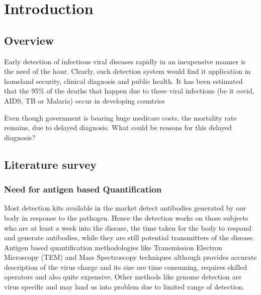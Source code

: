 \documentclass{FR16}
\begin{document}
\maketitle

\tableofcontents
\newpage

\section{Introduction}

\subsection{Overview}
Early detection of infectious viral diseases rapidly in an inexpensive manner is the need of the hour. Clearly, such detection system would find it application in homeland security, clinical diagnosis and public health. It has been estimated that the 95\% \cite{ninety5} of the deaths that happen due to these viral infections (be it covid, AIDS, TB or Malaria) occur in developing countries

Even though government is bearing huge medicare costs, the mortality rate remains, due to delayed diagnosis. What could be reasons for this delayed diagnosis?

\subsection{Literature survey}
 
\subsubsection{Need for antigen based Quantification }
Most detection kits available in the market detect antibodies generated by our body in response to the pathogen. Hence the detection works on those subjects who are at least a week into the disease, the time taken for the body to respond and generate antibodies, while they are still potential transmitters of the disease. 
Antigen based quantification methodologies like  Transmission Electron Microscopy (TEM) \cite{tem} and Mass Spectroscopy techniques \cite{massspec} although provides accurate description of the virus charge and its size are time consuming, requires skilled operators  and also quite expensive. Other methods like genome detection are virus specific and may land us into problem due to limited range of detection.
\end{document}
